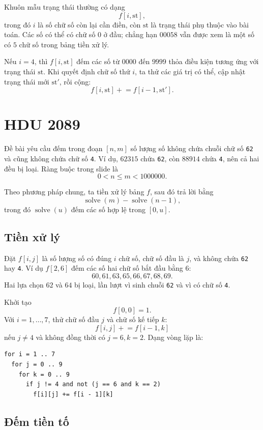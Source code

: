 \documentclass[11pt]{article}
\begin{document}
Khuôn mẫu trạng thái thường có dạng
\[
  f[i,\mathrm{st}],
\]
trong đó $i$ là số chữ số còn lại cần điền, còn $\mathrm{st}$ là trạng thái
phụ thuộc vào bài toán. Các số có thể có chữ số $0$ ở đầu; chẳng hạn
$00058$ vẫn được xem là một số có $5$ chữ số trong bảng tiền xử lý.

Nếu $i=4$, thì $f[i,\mathrm{st}]$ đếm các số từ $0000$ đến $9999$ thỏa điều
kiện tương ứng với trạng thái $\mathrm{st}$. Khi quyết định chữ số thứ $i$,
ta thử các giá trị có thể, cập nhật trạng thái mới $\mathrm{st}'$, rồi cộng:
\[
  f[i,\mathrm{st}] \mathrel{+}= f[i-1,\mathrm{st}'].
\]

\section{HDU 2089}

Đề bài yêu cầu đếm trong đoạn $[n,m]$ số lượng số không chứa chuỗi chữ số
\texttt{62} và cũng không chứa chữ số \texttt{4}. Ví dụ, $62315$ chứa
\texttt{62}, còn $88914$ chứa \texttt{4}, nên cả hai đều bị loại. Ràng buộc
trong slide là
\[
  0<n\le m<1000000.
\]

Theo phương pháp chung, ta tiền xử lý bảng $f$, sau đó trả lời bằng
\[
  \operatorname{solve}(m)-\operatorname{solve}(n-1),
\]
trong đó $\operatorname{solve}(u)$ đếm các số hợp lệ trong $[0,u]$.

\subsection{Tiền xử lý}

Đặt $f[i,j]$ là số lượng số có đúng $i$ chữ số, chữ số đầu là $j$, và không
chứa \texttt{62} hay \texttt{4}. Ví dụ $f[2,6]$ đếm các số hai chữ số bắt đầu
bằng $6$:
\[
  60,61,63,65,66,67,68,69.
\]
Hai lựa chọn $62$ và $64$ bị loại, lần lượt vì sinh chuỗi \texttt{62} và vì
có chữ số \texttt{4}.

Khởi tạo
\[
  f[0,0]=1.
\]
Với $i=1,\ldots,7$, thử chữ số đầu $j$ và chữ số kế tiếp $k$:
\[
  f[i,j]\mathrel{+}=f[i-1,k]
\]
nếu $j\ne 4$ và không đồng thời có $j=6,k=2$. Dạng vòng lặp là:
\begin{verbatim}
for i = 1 .. 7
  for j = 0 .. 9
    for k = 0 .. 9
      if j != 4 and not (j == 6 and k == 2)
        f[i][j] += f[i - 1][k]
\end{verbatim}

\subsection{Đếm tiền tố}
\end{document}
